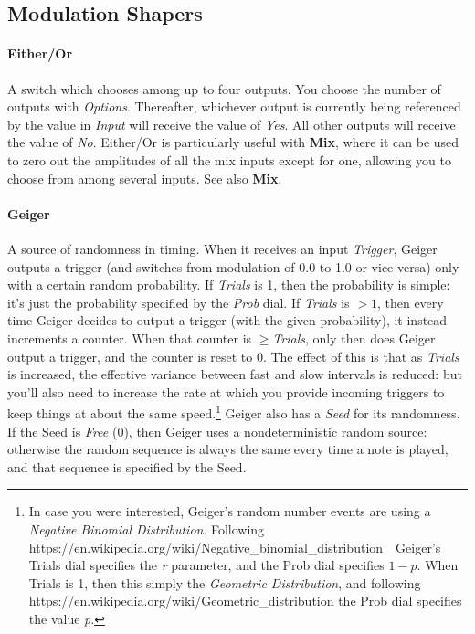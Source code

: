 \documentclass{article}
\begin{document}
\subsection{Modulation Shapers}

\paragraph{Either/Or}  A switch which chooses among up to four outputs.  You choose the number of outputs with {\it Options}.  Thereafter, whichever output is currently being referenced by the value in {\it Input} will receive the value of {\it Yes}.  All other outputs will receive the value of {\it No}.  Either/Or is particularly useful with {\bf Mix}, where it can be used to zero out the amplitudes of all the mix inputs except for one, allowing you to choose from among several inputs.  See also {\bf Mix}.

\paragraph{Geiger}  A source of randomness in timing.  When it receives an input {\it Trigger}, Geiger outputs a trigger (and switches from modulation of 0.0 to 1.0 or vice versa) only with a certain random probability.  If {\it Trials} is 1, then the probability is simple: it's just the probability specified by the {\it Prob} dial.  If {\it Trials} is \(>1\), then every time Geiger decides to output a trigger (with the given probability), it instead increments a counter.  When that counter is  \(\geq\){\it Trials}, only then does Geiger output a trigger, and the counter is reset to 0.  The effect of this is that as {\it Trials} is increased, the effective variance between fast and slow intervals is reduced: but you'll also need to increase the rate at which you provide incoming triggers to keep things at about the same speed.\footnote{In case you were interested, Geiger's random number events are using a {\it Negative Binomial Distribution}.  Following https:/\!/en.wikipedia.org/wiki/Negative\_binomial\_distribution\ \ Geiger's Trials dial specifies the {\it r} parameter, and the Prob dial specifies \(1-p\).  When Trials is 1, then this simply the {\it Geometric Distribution}, and following https:/\!/en.wikipedia.org/wiki/Geometric\_distribution the Prob dial specifies the value {\it p}.}  Geiger also has a {\it Seed} for its randomness.  If the Seed is {\it Free} (0), then Geiger uses a nondeterministic random source: otherwise the random sequence is always the same every time a note is played, and that sequence is specified by the Seed.
\end{document}
